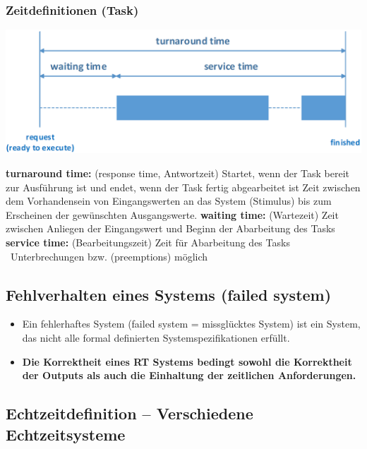 \subsubsection{Zeitdefinitionen (Task)}

\begin{center}
    \includegraphics[width=0.7\columnwidth]{images/zeitdefinitionen_task.png}
\end{center}

\begin{outline}
    \1 \textbf{turnaround time:} (response time, Antwortzeit) 
        \2 Startet, wenn der Task bereit zur Ausführung ist und endet, wenn der Task fertig abgearbeitet ist
        \2 Zeit zwischen dem Vorhandensein von Eingangswerten an das System (Stimulus) bis zum Erscheinen der gewünschten Ausgangswerte.
    \1 \textbf{waiting time:} (Wartezeit)
        \2 Zeit zwischen Anliegen der Eingangswert und Beginn der Abarbeitung des Tasks
    \1 \textbf{service time:} (Bearbeitungszeit)
        \2 Zeit für Abarbeitung des Tasks \textrightarrow\ Unterbrechungen bzw. (preemptions) möglich 
\end{outline}


\subsection{Fehlverhalten eines Systems (failed system)}

\begin{itemize}
    \item Ein fehlerhaftes System (failed system = missglücktes System) ist ein System, das nicht alle formal
        definierten Systemspezifikationen erfüllt.
    \item \textbf{Die Korrektheit eines RT Systems bedingt sowohl die Korrektheit der Outputs als auch die Einhaltung
        der zeitlichen Anforderungen.}
\end{itemize}


\subsection{Echtzeitdefinition -- Verschiedene Echtzeitsysteme}

